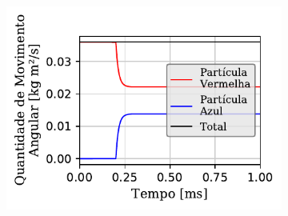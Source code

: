 \begin{figure}[htb!]
{\begin{subfigure}[t]{\smallresultsfigwidth}
			\caption{}
			\label{subfig:colliding_spheres:dissipative_rotation:y_linear_momentum}
		\end{subfigure}
		\begin{subfigure}[t]{\smallresultsfigwidth}
			\centering
			\includegraphics[scale=1]{images/colliding_spheres/dissipative_rotation/angularMomentum-Z_small_total_alternative.pdf}
			\caption{}
			\label{subfig:colliding_spheres:dissipative_rotation:z_angular_momentum}
		\end{subfigure}
	}
	\label{fig:colliding_spheres:dissipative_rotation:momentum_results}
	\sourceMe
\end{figure}

